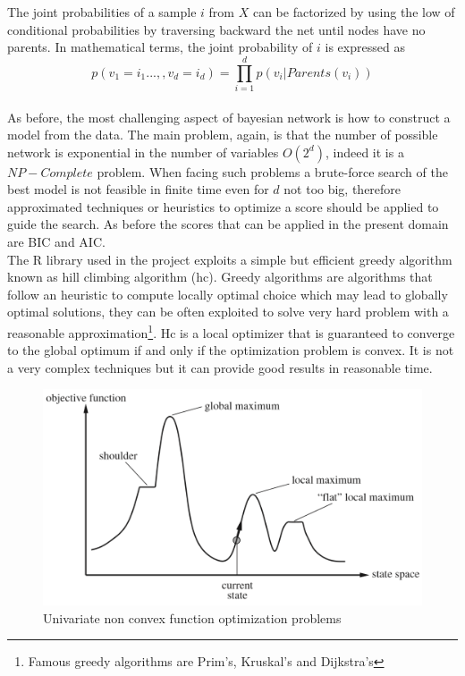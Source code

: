 \documentclass{article}
\begin{document}
The joint probabilities of a sample $i$ from $X$ can be factorized by using the low of conditional probabilities by traversing backward the net until nodes have no parents. In mathematical terms, the joint probability of $i$ is expressed as
\begin{equation}
    p(v_1 = i_1...,,v_d=i_d) = \prod\limits_{i=1}^{d}p(v_i|Parents(v_i))
\end{equation} \\
As before, the most challenging aspect of bayesian network is how to construct a model from the data. The main problem, again, is that the number of possible network is exponential in the number of variables $O(2^d)$, indeed it is a $NP-Complete$ problem. When facing such problems a brute-force search of the best model is not feasible in finite time even for $d$ not too big, therefore approximated techniques or heuristics to optimize a score should be applied to guide the search. As before the scores that can be applied in the present domain are BIC and AIC.\\
The R library used in the project exploits a simple but efficient greedy algorithm known as hill climbing algorithm (hc). Greedy algorithms are algorithms that follow an heuristic to compute locally optimal choice which may lead to globally optimal solutions, they can be often exploited to solve very hard problem with a reasonable approximation\footnote{Famous greedy algorithms are Prim's, Kruskal's and Dijkstra's}. Hc is a local optimizer that is guaranteed to converge to the global optimum if and only if the optimization problem is convex. It is not a very complex techniques but it can provide good results in reasonable time.
\begin{figure}[H]
       \centering
       \includegraphics[width=1\textwidth]{hc.PNG}
       \caption{Univariate non convex function optimization problems \cite{ArtInt}}
\end{figure}
\end{document}
